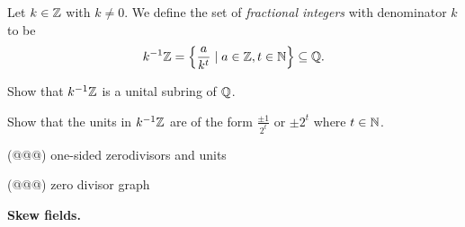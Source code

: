 \begin{dfn} \label{dfn:fractional-integers}
Let \(k \in \mathbb{Z}\) with \(k \neq 0\).
We define the set of \emph{fractional integers} with denominator \(k\) to be \[ {k}^{-1}\mathbb{Z} = \left\{ \frac{a}{k^t} \mid a \in \mathbb{Z}, t \in \mathbb{N} \right\} \subseteq \mathbb{Q}. \]
\end{dfn}

\begin{exercise}
Show that \({k}^{-1}\mathbb{Z}\) is a unital subring of \(\mathbb{Q}\).
\end{exercise}

\begin{exercise}
Show that the units in \({k}^{-1}\mathbb{Z}\) are of the form \(\frac{\pm 1}{2^t}\) or \(\pm 2^t\) where \(t \in \mathbb{N}\).
\end{exercise}

(@@@) one-sided zerodivisors and units

(@@@) zero divisor graph

\textbf{Skew fields.}
